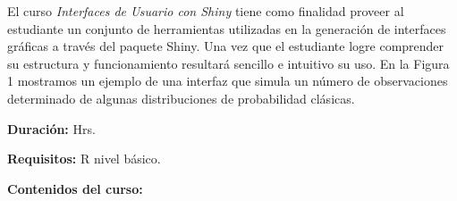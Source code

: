 \documentclass[12pt,a4paper,oneside]{article}\usepackage[]{graphicx}\usepackage[]{color}
\begin{document}
El curso \emph{Interfaces de Usuario con Shiny} tiene como finalidad proveer al estudiante un conjunto de herramientas utilizadas en la generación de interfaces gráficas a través del paquete Shiny. Una vez que el estudiante logre comprender su estructura y funcionamiento resultará sencillo e intuitivo su uso. En la Figura 1 mostramos un ejemplo de una interfaz que simula un número de observaciones determinado de algunas distribuciones de probabilidad clásicas.\newline

{\bf \large Duración:} Hrs.
  
{\bf \large Requisitos:}\newline
  R nivel básico.
  
{\bf \large Contenidos del curso:}
\end{document}
